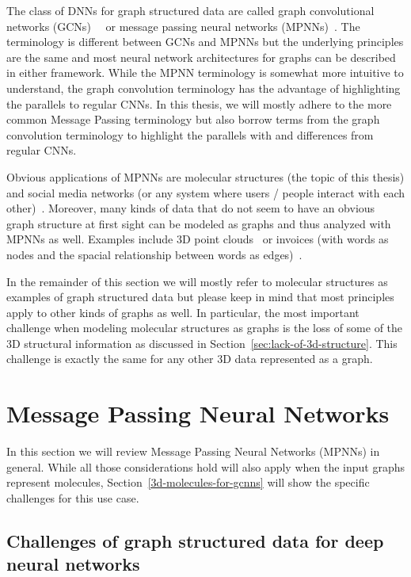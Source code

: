 The class of DNNs for graph structured data are called graph convolutional networks (GCNs)~\cite{Kipf2017}~\cite{Schutt2017} or message passing neural networks (MPNNs)~\cite{Gilmer2017}. The terminology is different between GCNs and MPNNs but the underlying principles are the same and most neural network architectures for graphs can be described in either framework. While the MPNN terminology is somewhat more intuitive to understand, the graph convolution terminology has the advantage of highlighting the parallels to regular CNNs. In this thesis, we will mostly adhere to the more common Message Passing terminology but also borrow terms from the graph convolution terminology to highlight the parallels with and differences from regular CNNs.

Obvious applications of MPNNs are molecular structures (the topic of this thesis) and social media networks (or any system where users / people interact with each other)~\cite{Zhou2018}. Moreover, many kinds of data that do not seem to have an obvious graph structure at first sight can be modeled as graphs and thus analyzed with MPNNs as well. Examples include 3D point clouds~\cite{Charles2017} or invoices (with words as nodes and the spacial relationship between words as edges)~\cite{Riba2019}.

In the remainder of this section we will mostly refer to molecular structures as examples of graph structured data but please keep in mind that most principles apply to other kinds of graphs as well. In particular, the most important challenge when modeling molecular structures as graphs is the loss of some of the 3D structural information as discussed in Section~\ref{sec:lack-of-3d-structure}. This challenge is exactly the same for any other 3D data represented as a graph.

\section{Message Passing Neural Networks}

In this section we will review Message Passing Neural Networks (MPNNs) in general. While all those considerations hold will also apply when the input graphs represent molecules, Section~\ref{3d-molecules-for-gcnns} will show the specific challenges for this use case.

\subsection{Challenges of graph structured data for deep neural networks}
\label{sec:graph-challenges}

